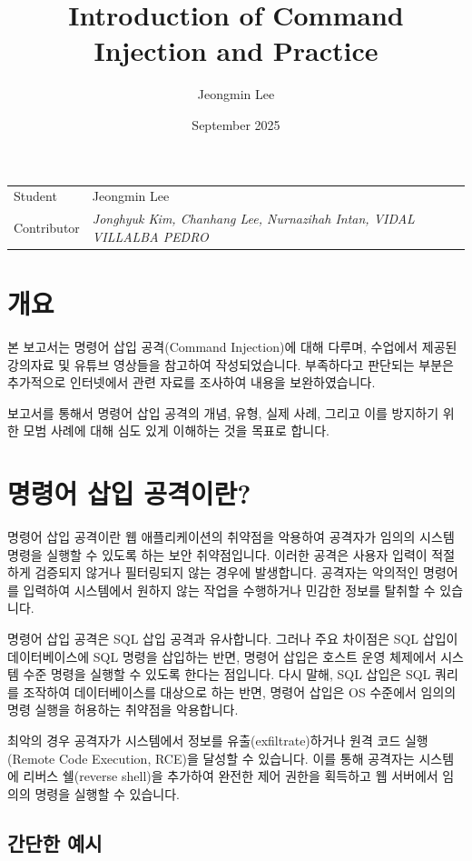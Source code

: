 \documentclass{article}
\title{Introduction of Command Injection and Practice}
\author{Jeongmin Lee}
\date{September 2025}
\begin{document}
\maketitle

\noindent\begin{tabular}{@{}ll}
  Student & Jeongmin Lee\\
  Contributor & \textit{Jonghyuk Kim, Chanhang Lee, Nurnazihah Intan, VIDAL VILLALBA PEDRO}\\
\end{tabular}

\section*{개요}
본 보고서는 명령어 삽입 공격(Command Injection)에 대해 다루며, 수업에서 제공된 강의자료 및 유튜브 영상들을 참고하여 작성되었습니다.
부족하다고 판단되는 부분은 추가적으로 인터넷에서 관련 자료를 조사하여 내용을 보완하였습니다. 

보고서를 통해서 명령어 삽입 공격의 개념, 유형, 실제 사례, 그리고 이를 방지하기 위한 모범 사례에 대해 심도 있게 이해하는 것을 목표로 합니다.

\section*{명령어 삽입 공격이란?}
명령어 삽입 공격이란 웹 애플리케이션의 취약점을 악용하여 공격자가 임의의 시스템 명령을 실행할 수 있도록 하는 보안 취약점입니다.
이러한 공격은 사용자 입력이 적절하게 검증되지 않거나 필터링되지 않는 경우에 발생합니다. 
공격자는 악의적인 명령어를 입력하여 시스템에서 원하지 않는 작업을 수행하거나 민감한 정보를 탈취할 수 있습니다.

명령어 삽입 공격은 SQL 삽입 공격과 유사합니다. 그러나 주요 차이점은 SQL 삽입이 데이터베이스에 SQL 명령을 삽입하는 반면, 
명령어 삽입은 호스트 운영 체제에서 시스템 수준 명령을 실행할 수 있도록 한다는 점입니다. 
다시 말해, SQL 삽입은 SQL 쿼리를 조작하여 데이터베이스를 대상으로 하는 반면, 명령어 삽입은 OS 수준에서 임의의 명령 실행을 허용하는 취약점을 악용합니다.

최악의 경우 공격자가 시스템에서 정보를 유출(exfiltrate)하거나 원격 코드 실행(Remote Code Execution, RCE)을 달성할 수 있습니다.
이를 통해 공격자는 시스템에 리버스 쉘(reverse shell)을 추가하여 완전한 제어 권한을 획득하고 웹 서버에서 임의의 명령을 실행할 수 있습니다.

\subsection*{간단한 예시}
\end{document}
